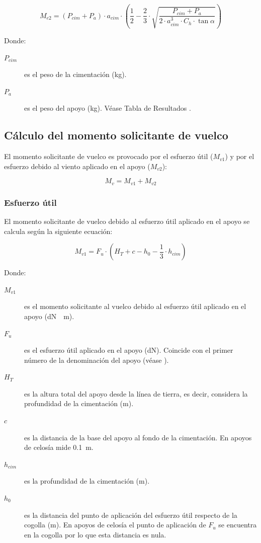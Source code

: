 \begin{equation}
    M_{e2} = (P_{cim}+P_a)\cdot a_{cim}\cdot (\frac{1}{2}-\frac{2}{3}\cdot\sqrt{\frac{P_{cim}+P_a}{2\cdot a_{cim}^3\cdot C_h\cdot\tan\alpha}})
    \label{eq:momento-estabilizador2}
\end{equation}

Donde:
\begin{description}
    \item[$P_{cim}$] es el peso de la cimentación (\si{\kilo\gram}).
    \item[$P_a$] es el peso del apoyo (\si{\kilo\gram}). Véase Tabla de Resultados .
    \end{description}
    
\subsection{Cálculo del momento solicitante de vuelco}
\label{subsubsec:cimentaciones-momento-vuelco}
El momento solicitante de vuelco es provocado por el esfuerzo útil ($M_{v1}$) y por el esfuerzo debido al viento aplicado en el apoyo ($M_{v2}$):

\begin{equation}
    M_v = M_{v1}+M_{v2}
    \label{eq:momento-vuelco}
\end{equation}
\subsubsection{Esfuerzo útil}
\label{subsubsec:momento-vuelco1}
El momento solicitante de vuelco debido al esfuerzo útil aplicado en el apoyo se calcula según la siguiente ecuación:

\begin{equation}
    M_{v1} = F_u\cdot(H_T+c-h_0-\frac{1}{3}\cdot h_{cim})
    \label{eq:momento-vuelco1}
\end{equation}

Donde:
\begin{description}
    \item[$M_{v1}$] es el momento solicitante al vuelco debido al esfuerzo útil aplicado en el apoyo (\si{\deca\newton\cdot\meter}).
    \item[$F_u$] es el esfuerzo útil aplicado en el apoyo (\si{\deca\newton}). Coincide con el primer número de la denominación del apoyo (véase ).
    \item[$H_T$] es la altura total del apoyo desde la línea de tierra, es decir, considera la profundidad de la cimentación (\si{\meter}).
    \item[$c$] es la distancia de la base del apoyo al fondo de la cimentación. En apoyos de celosía mide \SI{0.1}{\meter}.
    \item[$h_{cim}$] es la profundidad de la cimentación (\si{\meter}).
    \item[$h_0$] es la distancia del punto de aplicación del esfuerzo útil respecto de la cogolla (\si{\meter}). En apoyos de celosía el punto de aplicación de $F_u$ se encuentra en la cogolla por lo que esta distancia es nula.
\end{description}

